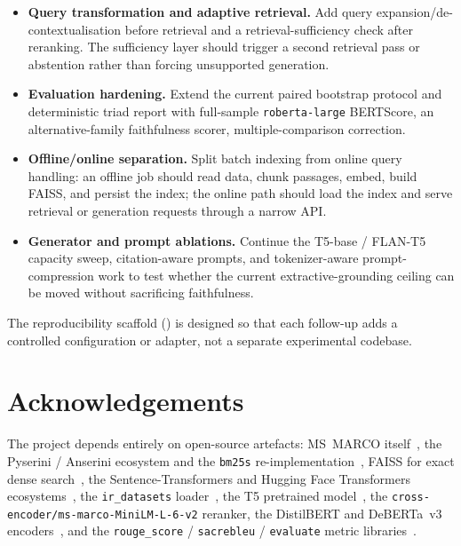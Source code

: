 \documentclass[11pt,a4paper]{article}
\newcommand{\msmarco}{MS~MARCO}
\newcommand{\bertscore}{BERTScore}
\begin{document}
\begin{itemize}
        length.
  \item \textbf{Query transformation and adaptive retrieval.}
        Add query expansion/de-contextualisation before retrieval and
        a retrieval-sufficiency check after reranking.  The
        sufficiency layer should trigger a second retrieval pass or
        abstention rather than forcing unsupported generation.
  \item \textbf{Evaluation hardening.}  Extend the current paired
        bootstrap protocol and deterministic triad report with
        full-sample \texttt{roberta-large} \bertscore{}, an
        alternative-family faithfulness scorer, multiple-comparison
        correction.
  \item \textbf{Offline/online separation.}  Split batch indexing
        from online query handling: an offline job should read data,
        chunk passages, embed, build FAISS, and persist the index;
        the online path should load the index and serve retrieval or
        generation requests through a narrow API.
  \item \textbf{Generator and prompt ablations.}  Continue the
        T5-base / FLAN-T5 capacity sweep, citation-aware prompts, and
        tokenizer-aware prompt-compression work to test whether the
        current extractive-grounding ceiling can be moved without
        sacrificing faithfulness.
\end{itemize}

The reproducibility scaffold () is
designed so that each follow-up adds a controlled configuration or
adapter, not a separate experimental codebase.

\clearpage
\section*{Acknowledgements}

The project depends entirely on open-source artefacts: \msmarco{}
itself~\cite{bajaj2016msmarco,nguyen2016msmarcoqa},
the Pyserini / Anserini ecosystem and the \texttt{bm25s}
re-implementation~\cite{lin2021pyserini,lu2024bm25s}, FAISS for
exact dense search~\cite{johnson2019faiss}, the Sentence-Transformers
and Hugging Face Transformers
ecosystems~\cite{reimers2019sbert,wolf2020transformers}, the
\texttt{ir\_datasets} loader~\cite{macavaney2021irdatasets}, the
T5 pretrained model~\cite{raffel2020t5}, the
\texttt{cross-encoder/ms-marco-MiniLM-L-6-v2} reranker, the
DistilBERT and DeBERTa~v3
encoders~\cite{sanh2019distilbert,he2023debertav3}, and the
\texttt{rouge\_score} / \texttt{sacrebleu} / \texttt{evaluate}
metric libraries~\cite{lin2004rouge,papineni2002bleu}.
\end{document}
